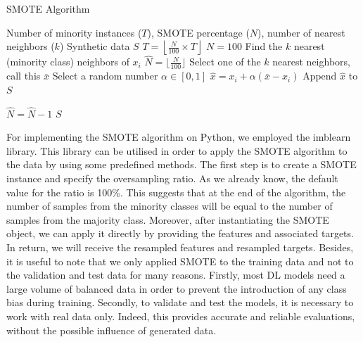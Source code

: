 \documentclass[12pt,oneside]{book} %
\begin{document}
\begin{algorithm}[H]
\caption{SMOTE Algorithm}
\label{Algorithm - SMOTE}
\begin{algorithmic}[1]
\Require Number of minority instances ($T$), SMOTE percentage ($N$), number of nearest neighbors ($k$)
\Ensure Synthetic data $S$
  \State $T = \left\lfloor \frac{N}{100} \times T \right\rfloor$
  \State $N = 100$
\EndIf
{}
  \State Find the $k$ nearest (minority class) neighbors of $x_i$
  \State $\hat{N} = \lfloor \frac{N}{100} \rfloor$
    \State Select one of the $k$ nearest neighbors, call this $\bar{x}$
    \State Select a random number $\alpha \in [0,1]$
    \State $\hat{x} = x_i + \alpha (\bar{x} - x_i)$
    \State Append $\hat{x}$ to $S$
\end{algorithmic}
\end{algorithm}

\begin{algorithm}[H]
\begin{algorithmic}[1]
    \State $\hat{N} = \hat{N} - 1$
  \EndWhile
\EndFor
\State \Return $S$
\end{algorithmic}
\end{algorithm}

\noindent For implementing the SMOTE algorithm on Python, we employed the imblearn library. This library can be utilised in order to apply the SMOTE algorithm to the data by using some predefined methods. The first step is to create a SMOTE instance and specify the oversampling ratio. As we already know, the default value for the ratio is 100\%. This suggests that at the end of the algorithm, the number of samples from the minority classes will be equal to the number of samples from the majority class. Moreover, after instantiating the SMOTE object, we can apply it directly by providing the features and associated targets. In return, we will receive the resampled features and resampled targets. Besides, it is useful to note that we only applied SMOTE to the training data and not to the validation and test data for many reasons. Firstly, most DL models need a large volume of balanced data in order to prevent the introduction of any class bias during training. Secondly, to validate and test the models, it is necessary to work with real data only. Indeed, this provides accurate and reliable evaluations, without the possible influence of generated data.
\end{document}
